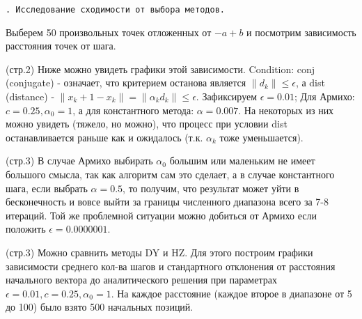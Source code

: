 \documentclass[a4paper,twocolumn,12pt]{article}
\newcounter{stage_counter}
\newenvironment{stage}[1]
{
\begin{center}  
  
  \texttt{\Roman{stage_counter}. #1}      
  
  \addtocounter{stage_counter}{1}
\end{center}  
}{}
\begin{document}
  \begin{stage}{Исследование сходимости от выбора методов.}
    
    Выберем 50 произвольных точек отложенных от \(-a+b\) и посмотрим зависимость расстояния точек от шага.
    
    (стр.2) Ниже можно увидеть графики этой зависимости. Condition: conj (conjugate) - означает, что критерием останова является
    \(\|d_k\| \leq \epsilon\), а dist (distance) - \( \|x_k+1-x_k\| = \|\alpha_k d_k\| \leq \epsilon \). Зафиксируем
    \(\epsilon=0.01\); Для Армихо: \(c=0.25, \alpha_0=1\), а для константного метода: \(\alpha=0.007\).
    На некоторых из них можно увидеть (тяжело, но можно), что процесс при условии dist останавливается раньше как и ожидалось 
    (т.к. \(\alpha_k\) тоже уменьшается). 
    
    (стр.3) В случае Армихо выбирать \(\alpha_0\) большим или маленьким не имеет большого смысла, так как 
    алгоритм сам это сделает, а в случае константного шага, если выбрать \(\alpha=0.5\), то получим, что результат может
    уйти в бесконечность и вовсе выйти за границы численного диапазона всего за 7-8 итераций. Той же проблемной ситуации
    можно добиться от Армихо если положить \(\epsilon = 0.0000001\). 
    
    (стр.3) Можно сравнить методы DY и HZ. Для этого построим графики зависимости среднего кол-ва шагов 
    и стандартного отклонения от расстояния начального вектора до аналитического решения при параметрах 
    \(\epsilon=0.01, c=0.25, \alpha_0=1 \). На каждое расстояние (каждое второе в диапазоне от 5 до 100) 
    было взято 500 начальных позиций. 
    
  \end{stage}
  \newpage
\end{document}
